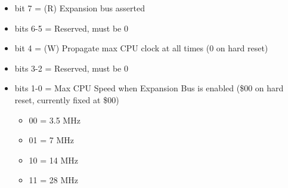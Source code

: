 \begin{itemize}
\item bit 7 = (R) Expansion bus  asserted
\item bits 6-5 = Reserved, must be 0
\item bit 4 = (W) Propagate max CPU clock at all times (0 on hard
  reset)
\item bits 3-2 = Reserved, must be 0
\item bits 1-0 = Max CPU Speed when Expansion Bus is enabled (\$00 on
  hard reset, currently fixed at \$00)
  \begin{itemize}
  \item 00 = 3.5 MHz
  \item 01 = 7 MHz
  \item 10 = 14 MHz
  \item 11 = 28 MHz
  \end{itemize}
\end{itemize}

